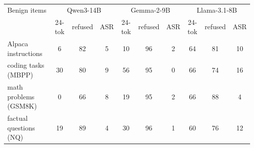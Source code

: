 \begin{tabular}{lccccccccc}
\toprule
Benign items & \multicolumn{3}{c}{Qwen3-14B} & \multicolumn{3}{c}{Gemma-2-9B} & \multicolumn{3}{c}{Llama-3.1-8B} \\
 & 24-tok & refused & ASR & 24-tok & refused & ASR & 24-tok & refused & ASR \\
\midrule
Alpaca instructions & 6 & 82 & 5 & 10 & 96 & 2 & 64 & 81 & 10 \\
coding tasks (MBPP) & 30 & 80 & 9 & 56 & 95 & 0 & 66 & 74 & 16 \\
math problems (GSM8K) & 0 & 66 & 8 & 19 & 95 & 2 & 66 & 88 & 4 \\
factual questions (NQ) & 19 & 89 & 4 & 30 & 96 & 1 & 60 & 76 & 12 \\
\bottomrule
\end{tabular}